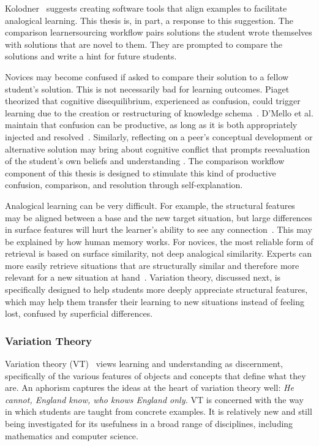 Kolodner~\cite{Kolodner} suggests creating software tools that align examples to facilitate analogical learning. This thesis is, in part, a response to this suggestion. The comparison learnersourcing workflow pairs solutions the student wrote themselves with solutions that are novel to them. They are prompted to compare the solutions and write a hint for future students.

Novices may become confused if asked to compare their solution to a fellow student's solution. This is not necessarily bad for learning outcomes. Piaget theorized that cognitive disequilibrium, experienced as confusion, could trigger learning due to the creation or restructuring of knowledge schema~\cite{disequilibrium}. D'Mello et al. maintain that confusion can be productive, as long as it is both appropriately injected and resolved~\cite{productiveconfusion}. Similarly, reflecting on a peer's conceptual development or alternative solution may bring about cognitive conflict that prompts reevaluation of the student's own beliefs and understanding \cite{kavanagh}. The comparison workflow component of this thesis is designed to stimulate this kind of productive confusion, comparison, and resolution through self-explanation. 

Analogical learning can be very difficult. For example, the structural features may be aligned between a base and the new target situation, but large differences in surface features will hurt the learner's ability to see any connection~\cite{Kurtz}. This may be explained by how human memory works. For novices, the most reliable form of retrieval is based on surface similarity, not deep analogical similarity. Experts can more easily retrieve situations that are structurally similar and therefore more relevant for a new situation at hand~\cite{Loewenstein}. Variation theory, discussed next, is specifically designed to help students more deeply appreciate structural features, which may help them transfer their learning to new situations instead of feeling lost, confused by superficial differences.

\subsubsection{Variation Theory}

Variation theory (VT)~\cite{marton1997learning} views learning and understanding as discernment, specifically of the various features of objects and concepts that define what they are. An aphorism captures the ideas at the heart of variation theory well: {\it He cannot, England know, who knows England only.} VT is concerned with the way in which students are taught from concrete examples. It is relatively new and still being investigated for its usefulness in a broad range of disciplines, including mathematics and computer science.%

